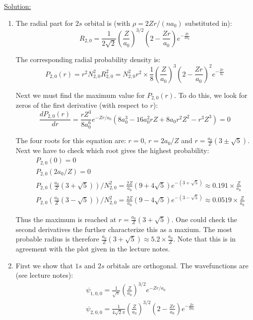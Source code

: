 \noindent
\underline{Solution:}\\

\begin{enumerate}
\item The radial part for $2s$ orbital is (with $\rho = 2Zr/(na_0)$ substituted in):
$$R_{2,0} = \frac{1}{2\sqrt{2}}\left(\frac{Z}{a_0}\right)^{3/2}\left(2 - \frac{Zr}{a_0}\right)e^{-\frac{Zr}{2a_0}}$$

The corresponding radial probability density is:
$$P_{2,0}(r) = r^2N^2_{2,0}R^2_{2,0} = N^2_{2,0}r^2\times\frac{1}{8}\left(\frac{Z}{a_0}\right)^3\left(2 - \frac{Zr}{a_0}\right)^2e^{-\frac{Zr}{a_0}}$$

Next we must find the maximum value for $P_{2,0}(r)$. To do this, we look for zeros of the first derivative (with respect to $r$):
$$\frac{dP_{2,0}(r)}{dr} = \frac{rZ^3}{8a_0^6}e^{-Zr/a_0}\left(8a_0^3 - 16a_0^2rZ + 8a_0r^2Z^2 - r^3Z^3\right) = 0$$

The four roots for this equation are: $r = 0$, $r = 2a_0/Z$ and $r = \frac{a_0}{Z}\left(3 \pm \sqrt{5}\right)$. Next we have to check which root gives the highest probability:
\begin{eqnarray}
\nonumber
& & P_{2,0}(0) = 0\\
\nonumber
& & P_{2,0}(2a_0/Z) = 0\\
\nonumber
& & P_{2,0}\left(\frac{a_0}{Z}\left(3 + \sqrt{5}\right)\right)/N_{2,0}^2 = \frac{2Z}{a_0}\left(9 + 4\sqrt{5}\right)e^{-(3 + \sqrt{5})}\approx 0.191\times \frac{Z}{a_0}\\
\nonumber
& & P_{2,0}\left(\frac{a_0}{Z}\left(3 - \sqrt{5}\right)\right)/N_{2,0}^2 = \frac{2Z}{a_0}\left(9 - 4\sqrt{5}\right)e^{-(3 - \sqrt{5})}\approx 0.0519\times \frac{Z}{a_0}
\end{eqnarray}

Thus the maximum is reached at $r = \frac{a_0}{Z}\left(3 + \sqrt{5}\right)$. One could check the second derivatives the further characterize this as a maxium. The most probable radius is therefore $\frac{a_0}{Z}\left(3 + \sqrt{5}\right)\approx 5.2\times\frac{a_0}{Z}$. Note that this is in agreement with the plot given in the lecture notes.

\item First we show that $1s$ and $2s$ orbitals are orthogonal. The wavefunctions are (see lecture notes):
\begin{eqnarray}
\nonumber
& & \psi_{1,0,0} = \frac{1}{\sqrt{\pi}}\left(\frac{Z}{a_0}\right)^{3/2}e^{-Zr/a_0}\\
\nonumber
& & \psi_{2,0,0} = \frac{1}{4\sqrt{2}\pi}\left(\frac{Z}{a_0}\right)^{3/2}\left(2 - \frac{Zr}{a_0}\right)e^{-\frac{Zr}{2a_0}}
\end{eqnarray}


\end{enumerate}
